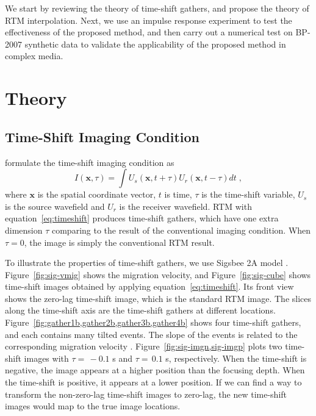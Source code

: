 We start by reviewing the theory of time-shift gathers, and propose the theory of RTM interpolation.
Next, we use an impulse response experiment to test the effectiveness of the proposed method,
and then carry out a numerical test on BP-2007 synthetic data to validate the applicability of the proposed method in complex media.

\section{Theory}

\subsection{Time-Shift Imaging Condition}

\cite{sava06} formulate the time-shift imaging condition as
\begin{equation}
I(\mathbf{x},\tau) = \int U_s(\mathbf{x},t+\tau) U_r(\mathbf{x},t-\tau) dt \; ,
\label{eq:timeshift}
\end{equation}
where $\mathbf{x}$ is the spatial coordinate vector, $t$ is time, $\tau$ is the time-shift variable, $U_s$ is the source wavefield
and $U_r$ is the receiver wavefield.
RTM with equation~\ref{eq:timeshift} produces time-shift gathers, which have one extra dimension $\tau$
comparing to the result of the conventional imaging condition.
When $\tau=0$, the image is simply the conventional RTM result.

To illustrate the properties of time-shift gathers, we use Sigsbee 2A model \cite[]{paffenholz02}.
Figure~\ref{fig:sig-vmig} shows the migration velocity, and
Figure~\ref{fig:sig-cube} shows time-shift images obtained by applying equation~\ref{eq:timeshift}.
Its front view shows the zero-lag time-shift image, which is the standard RTM image.
The slices along the time-shift axis are the time-shift gathers at different locations.
Figure~\ref{fig:gather1b,gather2b,gather3b,gather4b} shows four time-shift gathers,
and each contains many tilted events.
The slope of the events is related to the corresponding migration velocity \cite[]{sava06}.
Figure~\ref{fig:sig-imgn,sig-imgp} plots two time-shift images with $\tau= \, -0.1$ s and $\tau= \, 0.1$ s, respectively.
When the time-shift is negative, the image appears at a higher position than the focusing depth.
When the time-shift is positive, it appears at a lower position.
If we can find a way to transform the non-zero-lag time-shift images to zero-lag, the new time-shift images would map to the true image locations.

